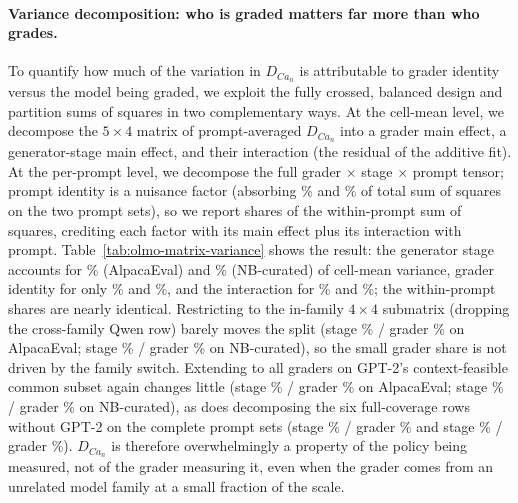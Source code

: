 \begin{table}[h]
\centering
\caption{Fold-change $R_\theta = \bar{D}_{\mathrm{base}} / \bar{D}_{\mathrm{DPO}}$ per grader row with bootstrap 95\% CIs (10{,}000 resamples over prompts), for the pre-registered rows and, after the gap, the exploratory cross-family extension. More-aligned graders see a smaller but still clearly above-parity drop.}
\label{tab:olmo-matrix-R}
\small
{}
\end{table}

\paragraph{Variance decomposition: who is graded matters far more than who grades.}
To quantify how much of the variation in $D_{Ca_n}$ is attributable to grader identity versus the model being graded, we exploit the fully crossed, balanced design and partition sums of squares in two complementary ways.
At the cell-mean level, we decompose the $5 \times 4$ matrix of prompt-averaged $D_{Ca_n}$ into a grader main effect, a generator-stage main effect, and their interaction (the residual of the additive fit).
At the per-prompt level, we decompose the full grader $\times$ stage $\times$ prompt tensor; prompt identity is a nuisance factor (absorbing \olmoMxAlpacaVarPromptPct\% and \olmoMxNbVarPromptPct\% of total sum of squares on the two prompt sets), so we report shares of the within-prompt sum of squares, crediting each factor with its main effect plus its interaction with prompt.
Table~\ref{tab:olmo-matrix-variance} shows the result: the generator stage accounts for \olmoMxAlpacaVarStagePct\% (AlpacaEval) and \olmoMxNbVarStagePct\% (NB-curated) of cell-mean variance, grader identity for only \olmoMxAlpacaVarGraderPct\% and \olmoMxNbVarGraderPct\%, and the interaction for \olmoMxAlpacaVarInteractionPct\% and \olmoMxNbVarInteractionPct\%; the within-prompt shares are nearly identical.
Restricting to the in-family $4 \times 4$ submatrix (dropping the cross-family Qwen row) barely moves the split (stage \olmoMxAlpacaVarStageInFamPct\% / grader \olmoMxAlpacaVarGraderInFamPct\% on AlpacaEval; stage \olmoMxNbVarStageInFamPct\% / grader \olmoMxNbVarGraderInFamPct\% on NB-curated), so the small grader share is not driven by the family switch.
Extending to all \olmoMxNGradersExt{} graders on GPT-2's context-feasible common subset again changes little (stage \olmoMxAlpacaVarExtStagePct\% / grader \olmoMxAlpacaVarExtGraderPct\% on AlpacaEval; stage \olmoMxNbVarExtStagePct\% / grader \olmoMxNbVarExtGraderPct\% on NB-curated), as does decomposing the six full-coverage rows without GPT-2 on the complete prompt sets (stage \olmoMxAlpacaVarExtNoGptTwoStagePct\% / grader \olmoMxAlpacaVarExtNoGptTwoGraderPct\% and stage \olmoMxNbVarExtNoGptTwoStagePct\% / grader \olmoMxNbVarExtNoGptTwoGraderPct\%).
$D_{Ca_n}$ is therefore overwhelmingly a property of the policy being measured, not of the grader measuring it, even when the grader comes from an unrelated model family at a small fraction of the scale.

